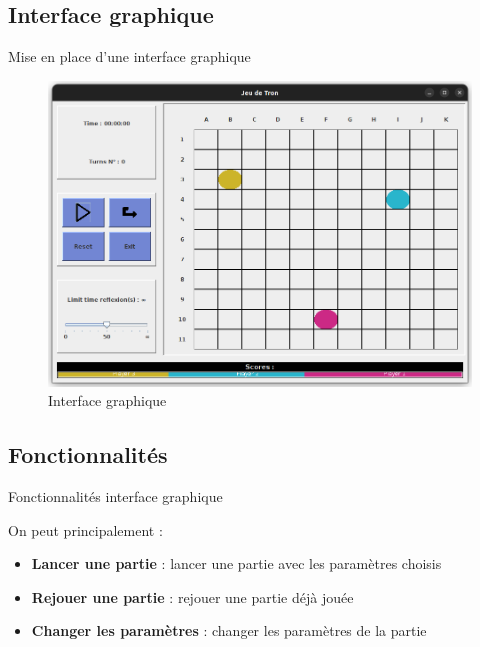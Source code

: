\subsection*{Interface graphique}
    \begin{frame}{Mise en place d'une interface graphique}
        \begin{figure}
            \begin{center}
                \includegraphics[scale=0.25]{Images/fenetrejeu}
                \caption{Interface graphique}
            \end{center}
        \end{figure}
    \end{frame}

\subsection*{Fonctionnalités}
    \begin{frame}{Fonctionnalités interface graphique}
        \begin{block}{On peut principalement :}
            \begin{itemize}
                \item \textbf{Lancer une partie} : lancer une partie avec les paramètres choisis
                \item \textbf{Rejouer une partie} : rejouer une partie déjà jouée
                \item \textbf{Changer les paramètres} : changer les paramètres de la partie
            \end{itemize}
        \end{block}
    \end{frame}



